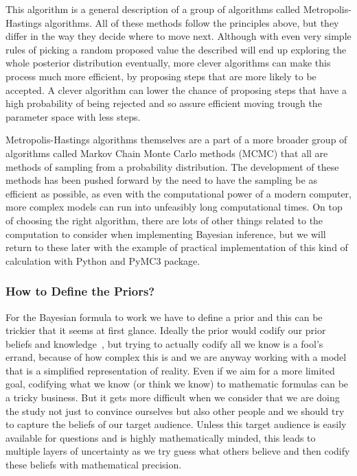 \documentclass[12pt,a4paper,leqno]{report}
\theoremstyle{plain}
\theoremstyle{definition}
\theoremstyle{remark}
\begin{document}
This algorithm is a general description of a group of algorithms called
Metropolis-Hastings algorithms. All of these methods follow the principles
above, but they differ in the way they decide where to move next. Although with
even very simple rules of picking a random proposed value the described will end
up exploring the whole posterior distribution eventually, more clever algorithms
can make this process much more efficient, by proposing steps that are more
likely to be accepted. A clever algorithm can lower the chance of
proposing steps that have a high probability of being rejected and so assure
efficient moving trough the parameter space with less steps.

Metropolis-Hastings algorithms themselves are a part of a more broader group of
algorithms called Markov Chain Monte Carlo methods (MCMC) that all are methods of
sampling from a probability distribution. The development of these methods has
been pushed forward by the need to have the sampling be as efficient as
possible, as even with the computational power of a modern computer, more complex
models can run into unfeasibly long computational times. On top of choosing the
right algorithm, there are lots of other things related to the computation to
consider when implementing Bayesian inference, but we will return to these later
with the example of practical implementation of this kind of calculation with
Python and PyMC3 package.

\subsubsection{How to Define the Priors?}\label{bayesproblems}

For the Bayesian formula to work we have to define a prior and this can be
trickier that it seems at first glance. Ideally the prior would codify our prior
beliefs and knowledge\ \cite{gelman, kruschke}, but trying to actually codify all we
know is a fool's errand, because of how complex this is and we are
anyway working with a model that is a simplified representation of reality. Even if
we aim for a more limited goal, codifying what we know (or think we know)
to mathematic formulas can be a tricky business. But it gets more
difficult when we consider that we are doing the study not just to convince ourselves
but also other people and we should try to capture the beliefs of our target audience.
Unless this target audience is easily available for questions and is highly mathematically minded,
this leads to multiple layers of uncertainty as we try guess what others
believe and then codify these beliefs with mathematical precision.
\end{document}
